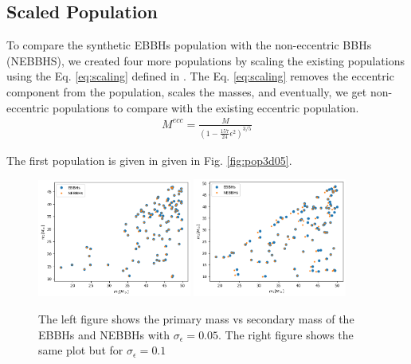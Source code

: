\documentclass[twocolumn,prd,nofootinbib]{revtex4}
\begin{document}
\subsection{Scaled Population}

To compare the synthetic EBBHs population with the non-eccentric BBHs (NEBBHS), we created four more populations by scaling the existing populations using the Eq. \ref{eq:scaling} defined in \cite{2021_scaling_paper}. The Eq. \ref{eq:scaling} removes the eccentric component from the population, scales the masses, and eventually, we get non-eccentric populations to compare with the existing eccentric population.
\begin{align}
\label{eq:scaling}
M^{ecc} = \frac{M}{(1-\frac{157}{24}\epsilon^2)^{3/5}}
\end{align}



The first population is given in 
given in Fig. \ref{fig:pop3d05}.  

\begin{figure}

\includegraphics[width=0.45\textwidth]{paper/figures/pop0.05.png}
\includegraphics[width=0.45\textwidth]{paper/figures/pop0.1.png}
\caption{\label{fig:pop_0.05_0.1} The left figure shows the primary mass vs secondary mass of the EBBHs and NEBBHs with $\sigma_\epsilon =0.05$. The right figure shows the same plot but for $\sigma_\epsilon=0.1$} 

\end{figure}
\end{document}
